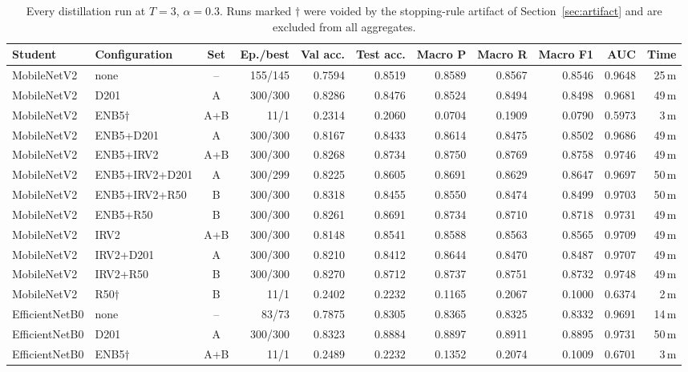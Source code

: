 \documentclass[10pt,letterpaper]{article}
\begin{document}
\begin{table}[H]
\centering
\footnotesize
\caption{Every distillation run at $T=3$, $\alpha=0.3$. Runs marked $\dagger$ were voided by the
stopping-rule artifact of Section~\ref{sec:artifact} and are excluded from all aggregates.}
\label{tab:all}
\setlength{\tabcolsep}{3.4pt}
\begin{tabular}{@{}llcrrrrrrrr@{}}
\toprule
Student & Configuration & Set & Ep./best & Val acc. & Test acc. & Macro P & Macro R & Macro F1 & AUC & Time \\
\midrule
MobileNetV2 & none & -- & 155/145 & 0.7594 & 0.8519 & 0.8589 & 0.8567 & 0.8546 & 0.9648 & 25\,m \\
MobileNetV2 & D201 & A & 300/300 & 0.8286 & 0.8476 & 0.8524 & 0.8494 & 0.8498 & 0.9681 & 49\,m \\
MobileNetV2 & ENB5$\dagger$ & A+B & 11/1 & 0.2314 & 0.2060 & 0.0704 & 0.1909 & 0.0790 & 0.5973 & 3\,m \\
MobileNetV2 & ENB5+D201 & A & 300/300 & 0.8167 & 0.8433 & 0.8614 & 0.8475 & 0.8502 & 0.9686 & 49\,m \\
MobileNetV2 & ENB5+IRV2 & A+B & 300/300 & 0.8268 & 0.8734 & 0.8750 & 0.8769 & 0.8758 & 0.9746 & 49\,m \\
MobileNetV2 & ENB5+IRV2+D201 & A & 300/299 & 0.8225 & 0.8605 & 0.8691 & 0.8629 & 0.8647 & 0.9697 & 50\,m \\
MobileNetV2 & ENB5+IRV2+R50 & B & 300/300 & 0.8318 & 0.8455 & 0.8550 & 0.8474 & 0.8499 & 0.9703 & 50\,m \\
MobileNetV2 & ENB5+R50 & B & 300/300 & 0.8261 & 0.8691 & 0.8734 & 0.8710 & 0.8718 & 0.9731 & 49\,m \\
MobileNetV2 & IRV2 & A+B & 300/300 & 0.8148 & 0.8541 & 0.8588 & 0.8563 & 0.8565 & 0.9709 & 49\,m \\
MobileNetV2 & IRV2+D201 & A & 300/300 & 0.8210 & 0.8412 & 0.8644 & 0.8470 & 0.8487 & 0.9707 & 49\,m \\
MobileNetV2 & IRV2+R50 & B & 300/300 & 0.8270 & 0.8712 & 0.8737 & 0.8751 & 0.8732 & 0.9748 & 49\,m \\
MobileNetV2 & R50$\dagger$ & B & 11/1 & 0.2402 & 0.2232 & 0.1165 & 0.2067 & 0.1000 & 0.6374 & 2\,m \\
\midrule
EfficientNetB0 & none & -- & 83/73 & 0.7875 & 0.8305 & 0.8365 & 0.8325 & 0.8332 & 0.9691 & 14\,m \\
EfficientNetB0 & D201 & A & 300/300 & 0.8323 & 0.8884 & 0.8897 & 0.8911 & 0.8895 & 0.9731 & 50\,m \\
EfficientNetB0 & ENB5$\dagger$ & A+B & 11/1 & 0.2489 & 0.2232 & 0.1352 & 0.2074 & 0.1009 & 0.6701 & 3\,m \\

\end{tabular}
\end{table}
\end{document}
